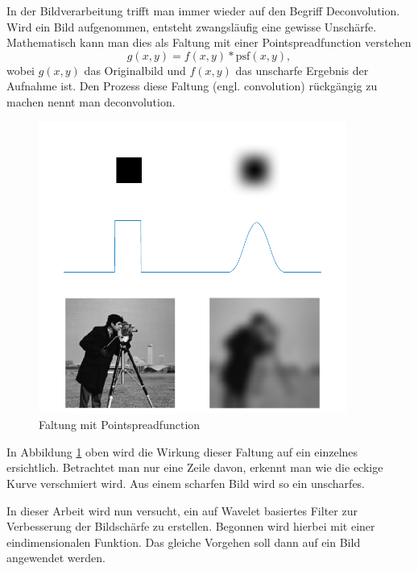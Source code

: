 In der Bildverarbeitung trifft man immer wieder auf den Begriff Deconvolution.
Wird ein Bild aufgenommen, entsteht zwangsläufig eine gewisse Unschärfe.
Mathematisch kann man dies als Faltung mit einer Pointspreadfunction verstehen
$$g(x,y) = f(x,y)*\text{psf}(x,y),$$
wobei $g(x,y)$ das Originalbild und $f(x,y)$ das unscharfe Ergebnis der Aufnahme ist.
Den Prozess diese Faltung (engl. convolution) rückgängig zu machen nennt man deconvolution.
\begin{figure}[h]
\centering
\includegraphics[width=0.9\textwidth]{./papers/deconvolve/pictures/psf.pdf}
\caption{Faltung mit Pointspreadfunction\label{deconvolve:pic}}
\end{figure}

In Abbildung \ref{deconvolve:pic} oben wird die Wirkung dieser Faltung auf ein einzelnes ersichtlich.
Betrachtet man nur eine Zeile davon, erkennt man wie die eckige Kurve \glqq verschmiert \grqq{} wird.
Aus einem scharfen Bild wird so ein unscharfes.

In dieser Arbeit wird nun versucht, ein auf Wavelet basiertes Filter zur Verbesserung der Bildschärfe zu erstellen. Begonnen wird hierbei mit einer eindimensionalen Funktion. Das gleiche Vorgehen soll dann auf ein Bild angewendet werden.